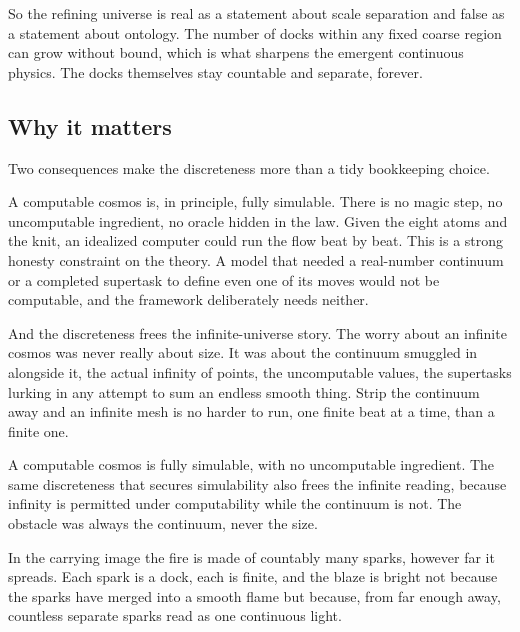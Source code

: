 So the refining universe is real as a statement about scale separation and false as a statement about ontology. The number of docks within any fixed coarse region can grow without bound, which is what sharpens the emergent continuous physics. The docks themselves stay countable and separate, forever.

\subsection{Why it matters}

Two consequences make the discreteness more than a tidy bookkeeping choice.

A computable cosmos is, in principle, fully simulable. There is no magic step, no uncomputable ingredient, no oracle hidden in the law. Given the eight atoms and the knit, an idealized computer could run the flow beat by beat. This is a strong honesty constraint on the theory. A model that needed a real-number continuum or a completed supertask to define even one of its moves would not be computable, and the framework deliberately needs neither.

And the discreteness frees the infinite-universe story. The worry about an infinite cosmos was never really about size. It was about the continuum smuggled in alongside it, the actual infinity of points, the uncomputable values, the supertasks lurking in any attempt to sum an endless smooth thing. Strip the continuum away and an infinite mesh is no harder to run, one finite beat at a time, than a finite one.

\begin{result}
A computable cosmos is fully simulable, with no uncomputable ingredient. The same discreteness that secures simulability also frees the infinite reading, because infinity is permitted under computability while the continuum is not. The obstacle was always the continuum, never the size.
\end{result}

In the carrying image the fire is made of countably many sparks, however far it spreads. Each spark is a dock, each is finite, and the blaze is bright not because the sparks have merged into a smooth flame but because, from far enough away, countless separate sparks read as one continuous light.
